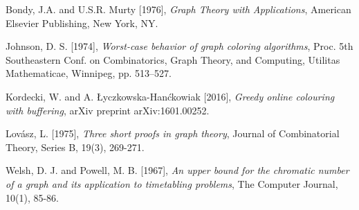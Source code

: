 \documentclass{article}
\begin{document}
\begin{thebibliography}{9}
Bondy, J.A. and U.S.R. Murty [1976],
\emph{Graph Theory with Applications},
American Elsevier Publishing, New York, NY.

Johnson, D. S. [1974], \emph{Worst-case behavior of graph coloring algorithms}, Proc. 5th Southeastern Conf. on Combinatorics, Graph Theory, and Computing, Utilitas Mathematicae, Winnipeg, pp. 513–527.

Kordecki, W. and A. Łyczkowska-Hanćkowiak [2016], \emph{Greedy online colouring with buffering}, arXiv preprint arXiv:1601.00252.

Lovász, L. [1975], \emph{Three short proofs in graph theory}, Journal of Combinatorial Theory, Series B, 19(3), 269-271.

Welsh, D. J. and Powell, M. B. [1967], \emph{An upper bound for the chromatic number of a graph and its application to timetabling problems}, The Computer Journal, 10(1), 85-86.

\end{thebibliography}
\end{document}
